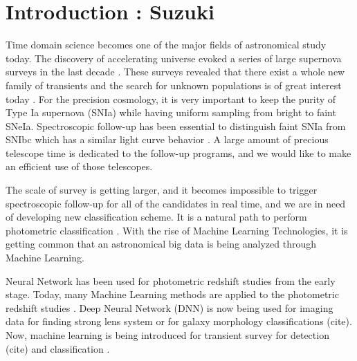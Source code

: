 \documentclass[useamsfonts]{pasj01}
\begin{document}
\section{Introduction : Suzuki}
Time domain science becomes one of the major fields of astronomical study today.  The discovery of accelerating universe \citep{perlmutter99a,riess98a} evoked a series of large supernova surveys in the last decade \citep{astier06b,wood-vasey07a,kessler09a,law09a}.  
These surveys revealed that there exist a whole new family of transients and the search for unknown populations is of great interest today \citep{howell06a,phillips07a,quimby07b}. 
For the precision cosmology, it is very important to keep the purity of Type Ia supernova (SNIa) while having uniform sampling from bright to faint SNeIa.  Spectroscopic follow-up has been essential to distinguish faint SNIa from SNIbc which has a similar light curve behavior \citep{scolnic14a}.   A large amount of precious telescope time is dedicated to the follow-up programs, and we would like to make an efficient use of those telescopes.

The scale of survey is getting larger, and it becomes impossible to trigger spectroscopic follow-up for all of the candidates in real time, and we are in need of developing new classification scheme.  It is a natural path to perform photometric classification \citep{sako11a}.  With the rise of Machine Learning Technologies, it is getting common that an astronomical big data is being analyzed through Machine Learning.   

Neural Network has been used for photometric redshift studies from the early stage.  Today, many Machine Learning methods are applied to the photometric redshift studies \citep{collister04a,carliles10a,pasquet19a}.
Deep Neural Network (DNN) is now being used for imaging data for finding strong lens system \citep{petrillo17a} or for galaxy morphology classifications (cite).  Now, machine learning is being introduced for transient survey for detection (cite) and classification \citep{charnock17a}.
\end{document}

